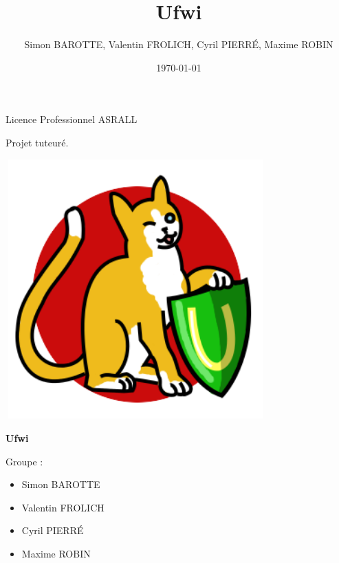 \documentclass[12pt]{report}
\title{Ufwi}
\author{Simon BAROTTE, Valentin FROLICH, Cyril PIERRÉ, Maxime ROBIN}
\date{\today}
\begin{document}
\thispagestyle{empty}
\begin{center}
Licence Professionnel ASRALL


\vspace{1cm}
Projet tuteuré.

\vspace{2,5cm}

\begin{center}
  \includegraphics[width=10cm,height=10cm]{images/ufwi.png}
\end{center}

\vspace{1cm}
\textbf{\Huge Ufwi}


\end{center}

\vspace{4cm}

Groupe :
\begin{itemize}
  \item Simon BAROTTE
  \item Valentin FROLICH
  \item Cyril PIERRÉ
  \item Maxime ROBIN
\end{itemize}



\newpage

\renewcommand{\contentsname}{Sommaire}
\tableofcontents
\end{document}
